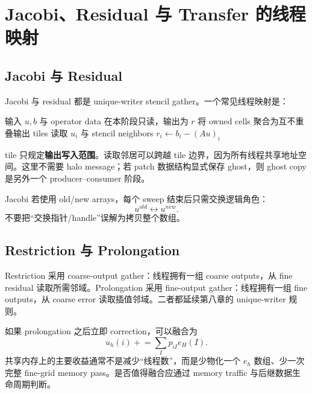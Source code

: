 \section{Jacobi、Residual 与 Transfer 的线程映射}

\subsection{Jacobi 与 Residual}

Jacobi 与 residual 都是 unique-writer stencil gather。一个常见线程映射是：

\begin{algorithm}[htbp]
\caption{共享内存 tile-based residual}
\begin{algorithmic}[1]
\State 输入 $u,b$ 与 operator data 在本阶段只读，输出为 $r$
\State 将 owned cells 聚合为互不重叠输出 tiles
    \State 读取 $u_i$ 与 stencil neighbors
    \State $r_i\gets b_i-(Au)_i$
  \EndFor
\EndFor
\end{algorithmic}
\end{algorithm}

tile 只规定\textbf{输出写入范围}。读取邻居可以跨越 tile 边界，因为所有线程共享地址空间。这里不需要 halo message；若 patch 数据结构显式保存 ghost，则 ghost copy 是另外一个 producer--consumer 阶段。

Jacobi 若使用 old/new arrays，每个 sweep 结束后只需交换逻辑角色：
\begin{equation}
u^{old}\leftrightarrow u^{new}.
\end{equation}
不要把“交换指针/handle”误解为拷贝整个数组。

\subsection{Restriction 与 Prolongation}

Restriction 采用 coarse-output gather：线程拥有一组 coarse outputs，从 fine residual 读取所需邻域。Prolongation 采用 fine-output gather：线程拥有一组 fine outputs，从 coarse error 读取插值邻域。二者都延续第八章的 unique-writer 规则。

如果 prolongation 之后立即 correction，可以融合为
\begin{equation}
u_h(i)
\mathrel{+}=
\sum_I p_{iI}e_H(I).
\end{equation}
共享内存上的主要收益通常不是减少“线程数”，而是少物化一个 $e_h$ 数组、少一次完整 fine-grid memory pass。是否值得融合应通过 memory traffic 与后继数据生命周期判断。

